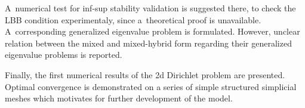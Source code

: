 A~numerical test for inf-sup stability validation is suggested there,
to check the LBB condition experimentaly, since a~theoretical proof is unavailable.
A~corresponding generalized eigenvalue problem is formulated.
However, unclear relation between the mixed and mixed-hybrid form regarding
their generalized eigenvalue problems is reported.

Finally, the first numerical results of the 2d Dirichlet problem are presented.
Optimal convergence is demonstrated on a series of simple structured simplicial meshes
which motivates for further development of the model.


